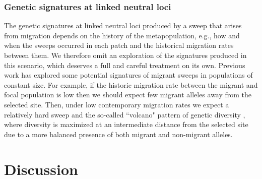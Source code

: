 \documentclass[]{article}
\begin{document}
\subsubsection*{Genetic signatures at linked neutral loci}

The genetic signatures at linked neutral loci produced by a sweep that arises from migration depends on the history of the metapopulation, e.g., how and when the sweeps occurred in each patch and the historical migration rates between them.
We therefore omit an exploration of the signatures produced in this scenario, which deserves a full and careful treatment on its own.
Previous work has explored some potential signatures of migrant sweeps in populations of constant size.
For example, if the historic migration rate between the migrant and focal population is low then we should expect few migrant alleles away from the selected site.
Then, under low contemporary migration rates we expect a relatively hard sweep and the so-called ``volcano" pattern of genetic diversity \citep{setter2019volcanofinder}, where diversity is maximized at an intermediate distance from the selected site due to a more balanced presence of both migrant and non-migrant alleles.

\section*{Discussion}
\label{sec:discussion}
\end{document}

